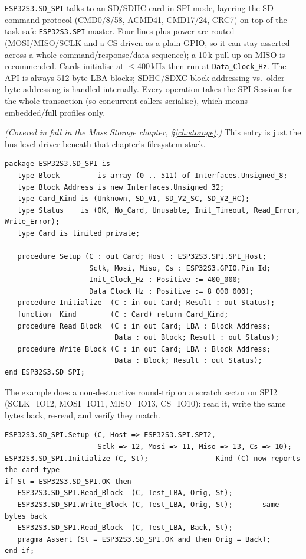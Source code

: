 \texttt{ESP32S3.SD\_SPI} talks to an SD/SDHC card in SPI mode, layering the SD
command protocol (CMD0/8/58, ACMD41, CMD17/24, CRC7) on top of the task-safe
\texttt{ESP32S3.SPI} master. Four lines plus power are routed (MOSI/MISO/SCLK and a
CS driven as a plain GPIO, so it can stay asserted across a whole
command/response/data sequence); a 10\,k pull-up on MISO is recommended. Cards
initialise at $\leq$400\,kHz then run at \texttt{Data\_Clock\_Hz}. The API is always
512-byte LBA blocks; SDHC/SDXC block-addressing vs.\ older byte-addressing is
handled internally. Every operation takes the SPI Session for the whole transaction
(so concurrent callers serialise), which means embedded/full profiles only.

\emph{(Covered in full in the Mass Storage chapter, \S\ref{ch:storage}.)} This
entry is just the bus-level driver beneath that chapter's filesystem stack.

\begin{lstlisting}
package ESP32S3.SD_SPI is
   type Block         is array (0 .. 511) of Interfaces.Unsigned_8;
   type Block_Address is new Interfaces.Unsigned_32;
   type Card_Kind is (Unknown, SD_V1, SD_V2_SC, SD_V2_HC);
   type Status    is (OK, No_Card, Unusable, Init_Timeout, Read_Error, Write_Error);
   type Card is limited private;

   procedure Setup (C : out Card; Host : ESP32S3.SPI.SPI_Host;
                    Sclk, Mosi, Miso, Cs : ESP32S3.GPIO.Pin_Id;
                    Init_Clock_Hz : Positive := 400_000;
                    Data_Clock_Hz : Positive := 8_000_000);
   procedure Initialize  (C : in out Card; Result : out Status);
   function  Kind        (C : Card) return Card_Kind;
   procedure Read_Block  (C : in out Card; LBA : Block_Address;
                          Data : out Block; Result : out Status);
   procedure Write_Block (C : in out Card; LBA : Block_Address;
                          Data : Block; Result : out Status);
end ESP32S3.SD_SPI;
\end{lstlisting}

The example does a non-destructive round-trip on a scratch sector on SPI2
(SCLK=IO12, MOSI=IO11, MISO=IO13, CS=IO10): read it, write the same bytes back,
re-read, and verify they match.

\begin{lstlisting}
ESP32S3.SD_SPI.Setup (C, Host => ESP32S3.SPI.SPI2,
                      Sclk => 12, Mosi => 11, Miso => 13, Cs => 10);
ESP32S3.SD_SPI.Initialize (C, St);            --  Kind (C) now reports the card type
if St = ESP32S3.SD_SPI.OK then
   ESP32S3.SD_SPI.Read_Block  (C, Test_LBA, Orig, St);
   ESP32S3.SD_SPI.Write_Block (C, Test_LBA, Orig, St);   --  same bytes back
   ESP32S3.SD_SPI.Read_Block  (C, Test_LBA, Back, St);
   pragma Assert (St = ESP32S3.SD_SPI.OK and then Orig = Back);
end if;
\end{lstlisting}

